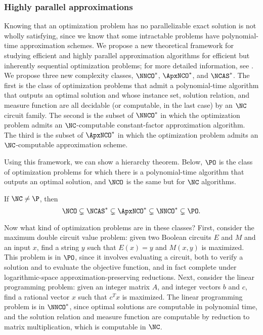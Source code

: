 \documentclass{article}
\begin{document}
\subsubsection{Highly parallel approximations}


Knowing that an optimization problem has no parallelizable exact solution is not wholly satisfying, since we know that some intractable problems have polynomial-time approximation schemes.
We propose a new theoretical framework for studying efficient and highly parallel approximation algorithms for efficient but inherently sequential optimization problems; for more detailed information, see \autocite{ncapproximation}.
We propose three new complexity classes, $\NNCO^*$, $\ApxNCO^*$, and $\NCAS^*$.
The first is the class of optimization problems that admit a polynomial-time algorithm that outputs an optimal solution and whose instance set, solution relation, and measure function are all decidable (or computable, in the last case) by an $\NC$ circuit family.
The second is the subset of $\NNCO^*$ in which the optimization problem admits an $\NC$-computable constant-factor approximation algorithm.
The third is the subset of $\ApxNCO^*$ in which the optimization problem admits an $\NC$-computable approximation scheme.

Using this framework, we can show a hierarchy theorem.
Below, $\PO$ is the class of optimization problems for which there is a polynomial-time algorithm that outputs an optimal solution, and $\NCO$ is the same but for $\NC$ algorithms.

\begin{theorem}
  If $\NC \neq \P$, then
  \begin{equation*}
    \NCO \subsetneq \NCAS^* \subsetneq \ApxNCO^* \subsetneq \NNCO^* \subsetneq \PO.
  \end{equation*}
\end{theorem}

Now what kind of optimization problems are in these classes?
First, consider the maximum double circuit value problem: given two Boolean circuits $E$ and $M$ and an input $x$, find a string $y$ such that $E(x) = y$ and $M(x, y)$ is maximized.
This problem is in $\PO$, since it involves evaluating a circuit, both to verify a solution and to evaluate the objective function, and in fact complete under logarithmic-space approximation-preserving reductions.
Next, consider the linear programming problem: given an integer matrix $A$, and integer vectors $b$ and $c$, find a rational vector $x$ such that $c^T x$ is maximized.
The linear programming problem is in $\NNCO^*$, since optimal solutions are computable in polynomial time, and the solution relation and measure function are computable by reduction to matrix multiplication, which is computable in $\NC$.
\end{document}
